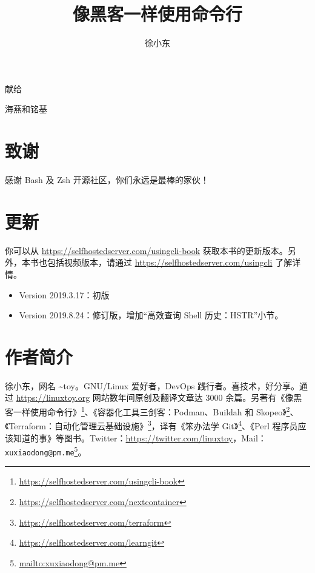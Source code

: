 \documentclass[]{ctexbook}
\title{像黑客一样使用命令行}
\author{徐小东}
\date{}
\providecommand{\tightlist}{%
  \setlength{\itemsep}{0pt}\setlength{\parskip}{0pt}}
\renewcommand{\href}[2]{#2\footnote{\url{#1}}}
\begin{document}
\maketitle


\thispagestyle{empty}

\begin{center}
献给

海燕和铭基
\end{center}

\setlength{\abovedisplayskip}{-5pt}
\setlength{\abovedisplayshortskip}{-5pt}

{
\setcounter{tocdepth}{2}
\tableofcontents
}
\listoftables
\listoffigures
\hypertarget{ux81f4ux8c22}{%
\chapter*{致谢}\label{ux81f4ux8c22}}


感谢 Bash 及 Zsh 开源社区，你们永远是最棒的家伙！

\hypertarget{ux66f4ux65b0}{%
\chapter*{更新}\label{ux66f4ux65b0}}


你可以从 \url{https://selfhostedserver.com/usingcli-book} 获取本书的更新版本。另外，本书也包括视频版本，请通过 \url{https://selfhostedserver.com/usingcli} 了解详情。

\begin{itemize}
\tightlist
\item
  Version 2019.3.17：初版
\item
  Version 2019.8.24：修订版，增加``高效查询 Shell 历史：HSTR''小节。
\end{itemize}

\hypertarget{author}{%
\chapter*{作者简介}\label{author}}


徐小东，网名 \textasciitilde{}toy。GNU/Linux 爱好者，DevOps 践行者。喜技术，好分享。通过 \url{https://linuxtoy.org} 网站数年间原创及翻译文章达 3000 余篇。另著有\href{https://selfhostedserver.com/usingcli-book}{《像黑客一样使用命令行》}、\href{https://selfhostedserver.com/nextcontainer}{《容器化工具三剑客：Podman、Buildah 和 Skopeo》}、\href{https://selfhostedserver.com/terraform}{《Terraform：自动化管理云基础设施》}，译有\href{https://selfhostedserver.com/learngit}{《笨办法学 Git》}、《Perl 程序员应该知道的事》等图书。Twitter：\url{https://twitter.com/linuxtoy}，Mail：\href{mailto:xuxiaodong@pm.me}{\nolinkurl{xuxiaodong@pm.me}}。
\end{document}
